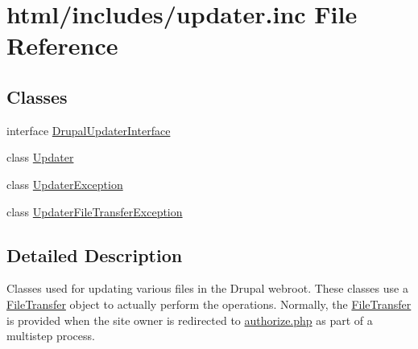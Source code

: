 \hypertarget{updater_8inc}{
\section{html/includes/updater.inc File Reference}
\label{updater_8inc}
}
\subsection*{Classes}
\begin{DoxyCompactItemize}
\item 
interface \hyperlink{interfaceDrupalUpdaterInterface}{DrupalUpdaterInterface}
\item 
class \hyperlink{classUpdater}{Updater}
\item 
class \hyperlink{classUpdaterException}{UpdaterException}
\item 
class \hyperlink{classUpdaterFileTransferException}{UpdaterFileTransferException}
\end{DoxyCompactItemize}


\subsection{Detailed Description}
Classes used for updating various files in the Drupal webroot. These classes use a \hyperlink{classFileTransfer}{FileTransfer} object to actually perform the operations. Normally, the \hyperlink{classFileTransfer}{FileTransfer} is provided when the site owner is redirected to \hyperlink{authorize_8php}{authorize.php} as part of a multistep process. 